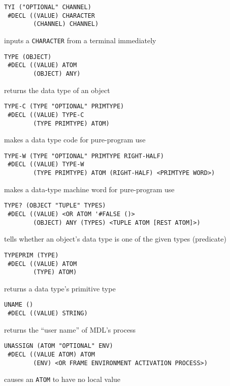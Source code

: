\documentclass[a4paper,]{article}
\begin{document}
\begin{verbatim}
TYI ("OPTIONAL" CHANNEL)
 #DECL ((VALUE) CHARACTER
        (CHANNEL) CHANNEL)
\end{verbatim}

inputs a \texttt{CHARACTER} from a terminal immediately

\begin{verbatim}
TYPE (OBJECT)
 #DECL ((VALUE) ATOM
        (OBJECT) ANY)
\end{verbatim}

returns the data type of an object

\begin{verbatim}
TYPE-C (TYPE "OPTIONAL" PRIMTYPE)
 #DECL ((VALUE) TYPE-C
        (TYPE PRIMTYPE) ATOM)
\end{verbatim}

makes a data type code for pure-program use

\begin{verbatim}
TYPE-W (TYPE "OPTIONAL" PRIMTYPE RIGHT-HALF)
 #DECL ((VALUE) TYPE-W
        (TYPE PRIMTYPE) ATOM (RIGHT-HALF) <PRIMTYPE WORD>)
\end{verbatim}

makes a data-type machine word for pure-program use

\begin{verbatim}
TYPE? (OBJECT "TUPLE" TYPES)
 #DECL ((VALUE) <OR ATOM '#FALSE ()>
        (OBJECT) ANY (TYPES) <TUPLE ATOM [REST ATOM]>)
\end{verbatim}

tells whether an object's data type is one of the given types (predicate)

\begin{verbatim}
TYPEPRIM (TYPE)
 #DECL ((VALUE) ATOM
        (TYPE) ATOM)
\end{verbatim}

returns a data type's primitive type

\begin{verbatim}
UNAME ()
 #DECL ((VALUE) STRING)
\end{verbatim}

returns the ``user name'' of MDL's process

\begin{verbatim}
UNASSIGN (ATOM "OPTIONAL" ENV)
 #DECL ((VALUE ATOM) ATOM
        (ENV) <OR FRAME ENVIRONMENT ACTIVATION PROCESS>)
\end{verbatim}

causes an \texttt{ATOM} to have no local value
\end{document}
